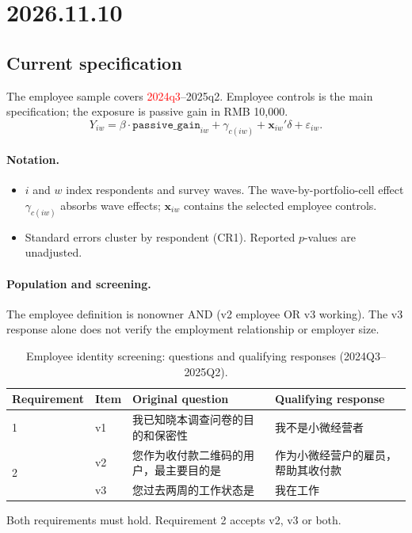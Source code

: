 \documentclass[11pt,letterpaper,english,final]{article}
\begin{document}
\clearpage
\section{2026.11.10}
\setcounter{table}{0}
\setcounter{figure}{0}
\label{sec:employee-current}

\subsection{Current specification}
The employee sample covers \textcolor{red}{2024q3}--2025q2. Employee controls is the main specification; the exposure is passive gain in RMB 10,000.
\[
Y_{iw}=\beta\cdot\texttt{passive\_gain}_{iw}
+\gamma_{c(iw)}+\bm{x}_{iw}'\delta+\varepsilon_{iw}.
\]
\paragraph{Notation.}
\begin{itemize}
\item $i$ and $w$ index respondents and survey waves. The wave-by-portfolio-cell effect $\gamma_{c(iw)}$ absorbs wave effects; $\bm{x}_{iw}$ contains the selected employee controls.
\item Standard errors cluster by respondent (CR1). Reported $p$-values are unadjusted.
\end{itemize}

\paragraph{Population and screening.}
The employee definition is nonowner AND (v2 employee OR v3 working). The v3 response alone does not verify the employment relationship or employer size.

\begin{table}[H]
\centering\small
\setlength{\tabcolsep}{5pt}
\renewcommand{\arraystretch}{1.3}
\caption{Employee identity screening: questions and qualifying responses (2024Q3--2025Q2).}
\label{tab:employee-identity-questions}
\begin{tabularx}{\linewidth}{@{}p{.15\linewidth}p{.08\linewidth}XX@{}}
\toprule
Requirement & Item & Original question & Qualifying response \\
\midrule
1 & v1 & 我已知晓本调查问卷的目的和保密性 & 我不是小微经营者 \\
\midrule
\multirow{2}{*}{2} & v2 & 您作为收付款二维码的用户，最主要目的是 & 作为小微经营户的雇员，帮助其收付款 \\
 & v3 & 您过去两周的工作状态是 & 我在工作 \\
\bottomrule
\end{tabularx}
\par\vspace{5pt}\begin{minipage}{\linewidth}\footnotesize Both requirements must hold. Requirement 2 accepts v2, v3 or both.\end{minipage}
\end{table}
\end{document}
